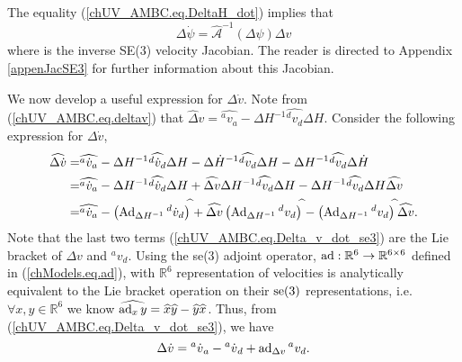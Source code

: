%
The equality (\ref{chUV_AMBC.eq.DeltaH_dot}) implies that  
%
\begin{equation}\label{chUV_AMBC.eq.delta_psi_dot}
\Delta \dot{ \psi} = \hat{\mathcal{A}}^{-1}(\Delta \psi) \Delta v
\end{equation}
%
where  is
the inverse SE(3) velocity Jacobian.  The reader is directed to Appendix
\ref{appenJacSE3} for further information about this Jacobian.




We now develop a useful expression for $\Delta \dot{v}$.
Note from (\ref{chUV_AMBC.eq.deltav}) that $\widehat\Delta
v=\widehat{{^a}v_a}-\Delta H^{-1}\widehat{{^d}v_d}\Delta H$. Consider
the following expression for $\Delta\dot{ v}$,
%
\begin{align}
\widehat{\Delta\dot{ v}}
 =&\widehat{{^a}\dot{v}_a}
  -\Delta H^{-1}\widehat{{^d}\dot{v}_d}\Delta H
  -\Delta\dot{ H}^{-1}\widehat{{^d}v_d}\Delta H
  -\Delta H^{-1}\widehat{{^d}v_d}\Delta\dot{ H} 
\nonumber \\
 =&\widehat{{^a}\dot{v}_a}
  -\Delta H^{-1}\widehat{{^d}\dot{v}_d}\Delta H
  +\widehat{\Delta v}\Delta H^{-1}\widehat{{^d}v_d}\Delta H
  -\Delta H^{-1}\widehat{{^d}v_d}\Delta H\widehat{\Delta v}
\nonumber \\
 =&\widehat{{^a}\dot{v}_a}
  -\left(\operatorname{Ad}_{\Delta H^{-1}}{^d}\dot{v}_d\right)^{\widehat{}}
  +\widehat{\Delta v}\left(\operatorname{Ad}_{\Delta H^{-1}}{^d}v_d\right)^{\widehat{}}
  -\left(\operatorname{Ad}_{\Delta H^{-1}}{^d}v_d\right)^{\widehat{}}\widehat{\Delta v}.
\label{chUV_AMBC.eq.Delta_v_dot_se3}
\end{align}
%
Note that the last two terms (\ref{chUV_AMBC.eq.Delta_v_dot_se3}) are
the Lie bracket of $\Delta v$ and ${^a}v_d$. Using the se(3)
adjoint operator, $\operatorname{ad}:\mathbb{R}^6\to\mathbb{R}^{6\times 6}$ defined
in (\ref{chModels.eq.ad}), with $\mathbb{R}^6$ representation of
velocities is analytically equivalent to the Lie bracket operation on
their $\se3$ representations, i.e. $\forall x,y\in\mathbb{R}^6$ we
know $\widehat{\operatorname{ad}_x y}=\widehat{x}\widehat{y}-\widehat{y}
\widehat{x}$. Thus, from (\ref{chUV_AMBC.eq.Delta_v_dot_se3}), we have
%
\begin{equation}\label{chUV_AMBC.eq.delta_v_dot}
\Delta\dot{ v} = {^a}\dot{v}{_a}-{^a}\dot{v}{_d}+\operatorname{ad}_{\Delta v} {^a}v_d.
\end{equation}

